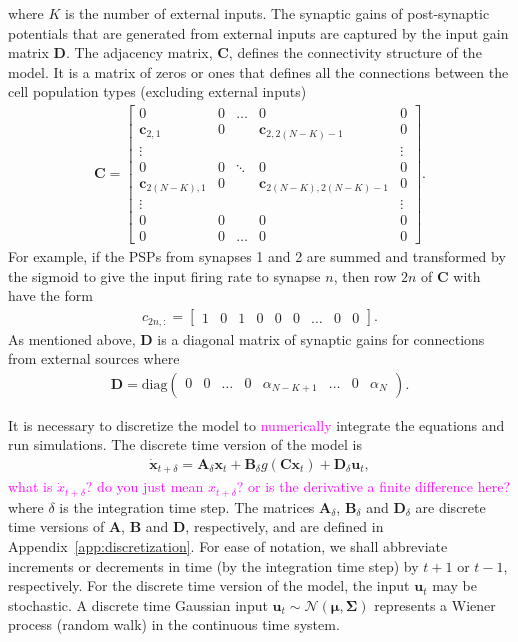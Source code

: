 \documentclass{article}
\newcommand{\unit}[1]{\textcolor{magenta}{#1}}
\begin{document}
where $K$ is the number of external inputs. The synaptic gains of post-synaptic potentials that are generated from external inputs are captured by the input gain matrix $\mathbf{D}$. The adjacency matrix, $\mathbf{C}$, defines the connectivity structure of the model. It is a matrix of zeros or ones that defines all the connections between the cell population types (excluding external inputs) 
\begin{align}
	\mathbf{C} = \begin{bmatrix} 0 & 0 & \hdots & 0 & 0 \\
	\mathbf{c}_{2,1} & 0 &  & \mathbf{c}_{2,2(N-K)-1} & 0 \\ 
	\vdots & &  & & \vdots \\
	0 & 0 & \ddots & 0 & 0 \\
 	\mathbf{c}_{2(N-K),1} & 0 &  & \mathbf{c}_{2(N-K),2(N-K)-1} & 0 \\
	\vdots & & & & \vdots \\
	0 & 0 & & 0 & 0 \\
	0 & 0 & \hdots & 0 & 0 \end{bmatrix}. 
\end{align}
For example, if the PSPs from synapses 1 and 2 are summed and transformed by the sigmoid to give the input firing rate to synapse $n$, then row $2n$ of $\mathbf{C}$ with have the form
\begin{align}
	c_{2n,:} = \begin{bmatrix} 1 & 0 & 1 & 0 & 0 & 0 & \hdots & 0 & 0 \end{bmatrix}.
\end{align}
As mentioned above, $\mathbf{D}$ is a diagonal matrix of synaptic gains for connections from external sources where
\begin{align}
	\mathbf{D} = \mathrm{diag} \left(\begin{array}{cccccccc}0 & 0 & \hdots & 0 & \alpha_{N-K+1} & \hdots & 0 & \alpha_N\end{array}\right).
\end{align}

It is necessary to discretize the model to \unit{numerically} integrate the equations and run simulations. The discrete time version of the model is 
\begin{align}
	\dot{\mathbf{x}}_{t+\delta} = \mathbf{A}_{\delta}\mathbf{x}_t + \mathbf{B}_{\delta} g\left(\mathbf{C}\mathbf{x}_t\right) + \mathbf{D}_{\delta}\mathbf{u}_t,
\end{align}
\unit{what is $\dot x_{t+\delta}$? do you just mean $x_{t+\delta}$? or is the derivative a finite difference here?}
where $\delta$ is the integration time step. The matrices $\mathbf{A}_{\delta}$, $\mathbf{B}_{\delta}$ and $\mathbf{D}_{\delta}$ are discrete time versions of $\mathbf{A}$, $\mathbf{B}$ and $\mathbf{D}$, respectively, and are defined in Appendix~\ref{app:discretization}. For ease of notation, we shall abbreviate increments or decrements in time (by the integration time step) by $t+1$ or $t-1$, respectively. For the discrete time version of the model, the input $\mathbf{u}_t$ may be stochastic. A discrete time Gaussian input $\mathbf{u}_t\sim\mathcal{N}(\boldsymbol{\mu},\boldsymbol{\Sigma})$ represents a Wiener process (random walk) in the continuous time system. 
\end{document}

